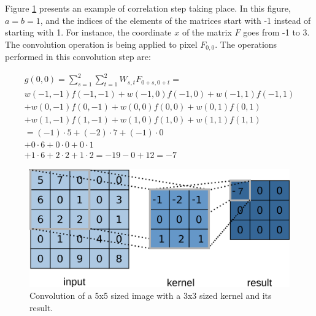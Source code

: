 Figure \ref{fig:figure117} presents an example of correlation step taking place. In this figure, $a=b=1$, and the indices of the elements of the matrices start with -1 instead of starting with 1. For instance, the coordinate $x$ of the matrix $F$ goes from -1 to 3. The convolution operation is being applied to pixel $F_{0,0}$. The operations performed in this convolution step are:

\begin{equation}
\begin{split}
g(0,0)=\sum_{s=1}^{2}\sum_{t=1}^{2}W_{s,t}{F}_{0+s,0+t}= \\
w(-1,-1)f(-1,-1)+w(-1,0)f(-1,0)+w(-1,1)f(-1,1) \\
+w(0,-1)f(0,-1)+w(0,0)f(0,0)+w(0,1)f(0,1) \\
+w(1,-1)f(1,-1)+w(1,0)f(1,0)+w(1,1)f(1,1)\\
=(-1)\cdot5+(-2)\cdot7+(-1)\cdot0\\
+0\cdot6+0\cdot0+0\cdot1\\
+1\cdot6+2\cdot2+1\cdot2
=-19-0+12=-7
\end{split}
\end{equation}

\begin{figure}[h]
    \centering
    \includegraphics[scale=0.40]{"Part 3 - Learning Systems/Supervised Learning/Deep Learning/images/figure117.png"}
    \caption{Convolution of a 5x5 sized image with a 3x3 sized kernel and its result.}
    \label{fig:figure117}
\end{figure}


